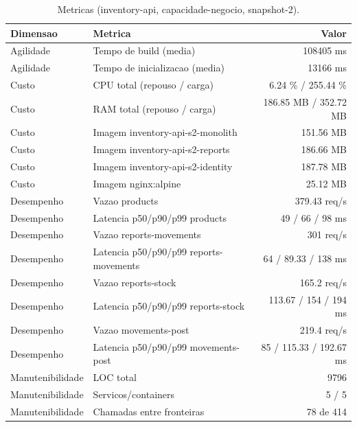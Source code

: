 \begin{table}[htb]
  \centering
  \caption{Metricas (inventory-api, capacidade-negocio, snapshot-2).}
  \label{tab:metricas-inventory-api-capacidade-negocio-snapshot-2}
  \begin{tabular}{llr}
    \hline
    \textbf{Dimensao} & \textbf{Metrica} & \textbf{Valor} \\
    \hline
    Agilidade & Tempo de build (media) & 108405 ms \\
    Agilidade & Tempo de inicializacao (media) & 13166 ms \\
    Custo & CPU total (repouso / carga) & 6.24 \% / 255.44 \% \\
    Custo & RAM total (repouso / carga) & 186.85 MB / 352.72 MB \\
    Custo & Imagem inventory-api-s2-monolith & 151.56 MB \\
    Custo & Imagem inventory-api-s2-reports & 186.66 MB \\
    Custo & Imagem inventory-api-s2-identity & 187.78 MB \\
    Custo & Imagem nginx:alpine & 25.12 MB \\
    Desempenho & Vazao products & 379.43 req/s \\
    Desempenho & Latencia p50/p90/p99 products & 49 / 66 / 98 ms \\
    Desempenho & Vazao reports-movements & 301 req/s \\
    Desempenho & Latencia p50/p90/p99 reports-movements & 64 / 89.33 / 138 ms \\
    Desempenho & Vazao reports-stock & 165.2 req/s \\
    Desempenho & Latencia p50/p90/p99 reports-stock & 113.67 / 154 / 194 ms \\
    Desempenho & Vazao movements-post & 219.4 req/s \\
    Desempenho & Latencia p50/p90/p99 movements-post & 85 / 115.33 / 192.67 ms \\
    Manutenibilidade & LOC total & 9796 \\
    Manutenibilidade & Servicos/containers & 5 / 5 \\
    Manutenibilidade & Chamadas entre fronteiras & 78 de 414 \\
    \hline
  \end{tabular}
\end{table}
